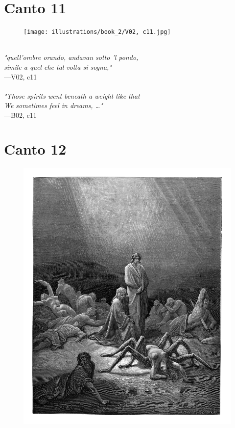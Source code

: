 \documentclass[../Dore_vision.tex]{subfiles}
\begin{document}
\newpage

\section{Canto 11}

\begin{figure}[ht]
\centering
\texttt{[image: illustrations/book\_2/V02, c11.jpg]}
\end{figure}

\begin{center}
\begin{minipage}{0.8\linewidth}
\textit{\\
"quell’ombre orando, andavan sotto ’l pondo,\\simile a quel che tal volta si sogna,"} \\
—V02, c11 \\~\\
\textit{"Those spirits went beneath a weight like that\\We sometimes feel in dreams, …"} \\
—B02, c11
\end{minipage}
\end{center}

\newpage

\section{Canto 12}

\begin{figure}[ht]
\centering
\includegraphics[height=\figsize]{illustrations/book_2/V02, c12.jpg}
\end{figure}
\end{document}
